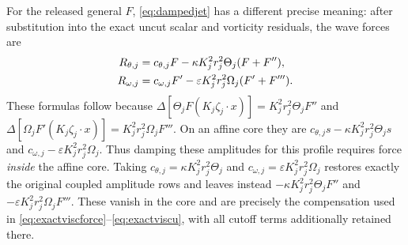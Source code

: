 For the released general $F$, \eqref{eq:dampedjet} has a different
precise meaning: after substitution into the exact uncut scalar
and vorticity residuals, the wave forces are
\begin{align}
 R_{\theta,j}&=c_{\theta,j}F-
 \kappa K_j^2r_j^2\Theta_j(F+F''),\notag\\
 R_{\omega,j}&=c_{\omega,j}F'-
 \varepsilon K_j^2r_j^2\Omega_j(F'+F''').
 \label{eq:dampedprofileforce}
\end{align}
These formulas follow because
$\Delta[\Theta_jF(K_j\zeta_j\cdot x)]
=K_j^2r_j^2\Theta_jF''$ and
$\Delta[\Omega_jF'(K_j\zeta_j\cdot x)]
=K_j^2r_j^2\Omega_jF'''$. On an affine core they are
$c_{\theta,j}s-\kappa K_j^2r_j^2\Theta_js$ and
$c_{\omega,j}-\varepsilon K_j^2r_j^2\Omega_j$.
Thus damping these amplitudes for this profile requires force
\emph{inside} the affine core. Taking
$c_{\theta,j}=\kappa K_j^2r_j^2\Theta_j$ and
$c_{\omega,j}=\varepsilon K_j^2r_j^2\Omega_j$ restores exactly
the original coupled amplitude rows and leaves instead
$-\kappa K_j^2r_j^2\Theta_jF''$ and
$-\varepsilon K_j^2r_j^2\Omega_jF'''$.
These vanish in the core and are precisely the compensation used
in \eqref{eq:exactviscforce}--\eqref{eq:exactviscu}, with all
cutoff terms additionally retained there.

